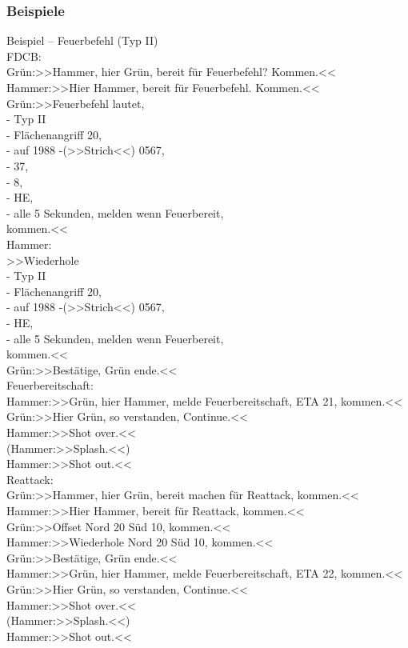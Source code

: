 \subsubsection{Beispiele}
	Beispiel – Feuerbefehl (Typ II) \\

	FDCB: \\

	 Grün:>>Hammer, hier Grün, bereit für Feuerbefehl? Kommen.<< \\
	 Hammer:>>Hier Hammer, bereit für Feuerbefehl. Kommen.<< \\
	 Grün:>>Feuerbefehl lautet,  \\
	 - Typ II \\
	 - Flächenangriff 20, \\
	 - auf 1988 -(>>Strich<<) 0567, \\
	 - 37, \\
	 - 8, \\
	 - HE, \\
	 - alle 5 Sekunden, melden wenn Feuerbereit, \\
	 kommen.<< \\


	Hammer:   \\

	 >>Wiederhole  \\
	 - Typ II  \\
	 - Flächenangriff 20,  \\
	 - auf 1988 -(>>Strich<<) 0567,  \\
	 - HE,  \\
	 - alle 5 Sekunden, melden wenn Feuerbereit,  \\
	 kommen.<<  \\
	 Grün:>>Bestätige, Grün ende.<<  \\
	 Feuerbereitschaft:  \\
	 Hammer:>>Grün, hier Hammer, melde Feuerbereitschaft, ETA 21, kommen.<<  \\
	 Grün:>>Hier Grün, so verstanden, Continue.<<  \\
	 Hammer:>>Shot over.<<  \\
	 (Hammer:>>Splash.<<)  \\
	 Hammer:>>Shot out.<<  \\


	Reattack:  \\

	 Grün:>>Hammer, hier Grün, bereit machen für Reattack, kommen.<<  \\
	 Hammer:>>Hier Hammer, bereit für Reattack, kommen.<< \\
	 Grün:>>Offset Nord 20 Süd 10, kommen.<< \\
	 Hammer:>>Wiederhole Nord 20 Süd 10, kommen.<< \\
	 Grün:>>Bestätige, Grün ende.<< \\
	 Hammer:>>Grün, hier Hammer, melde Feuerbereitschaft, ETA 22, kommen.<< \\
	 Grün:>>Hier Grün, so verstanden, Continue.<< \\
	 Hammer:>>Shot over.<< \\
	 (Hammer:>>Splash.<<) \\
	 Hammer:>>Shot out.<< \\

